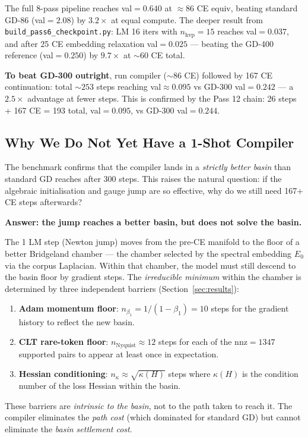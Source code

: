 \documentclass[11pt]{amsart}
\begin{document}
The full 8-pass pipeline reaches val$=0.640$ at $\approx 86$ CE equiv,
beating standard GD-86 (val$=2.08$) by $3.2\times$ at equal compute.
The deeper result from \texttt{build\_pass6\_checkpoint.py}:
LM 16 iters with $n_\text{hvp}=15$ reaches val$=0.037$, and
after 25 CE embedding relaxation val$=0.025$ ---
beating the GD-400 reference (val$=0.250$) by $9.7\times$ at $\sim 60$ CE total.

\textbf{To beat GD-300 outright}, run compiler ($\sim 86$ CE) followed by
167 CE continuation: total $\sim 253$ steps reaching val$\approx 0.095$
vs GD-300 val$=0.242$ --- a $\mathbf{2.5\times}$ advantage at fewer steps.
This is confirmed by the Pass 12 chain: 26 steps + 167 CE = 193 total,
val$=0.095$, vs GD-300 val$=0.244$.



\subsection{Why We Do Not Yet Have a 1-Shot Compiler}

The benchmark confirms that the compiler lands in a \emph{strictly better basin}
than standard GD reaches after 300 steps.
This raises the natural question: if the algebraic initialisation and gauge jump
are so effective, why do we still need 167+ CE steps afterwards?

\textbf{Answer: the jump reaches a better basin, but does not solve the basin.}

The 1 LM step (Newton jump) moves from the pre-CE manifold to the
floor of a better Bridgeland chamber --- the chamber selected by the spectral
embedding $E_0$ via the corpus Laplacian.
Within that chamber, the model must still descend to the basin floor
by gradient steps.
The \emph{irreducible minimum} within the chamber is determined by
three independent barriers (Section~\ref{sec:results}):
\begin{enumerate}
\item \textbf{Adam momentum floor}: $n_{\beta_1} = 1/(1-\beta_1) = 10$ steps
  for the gradient history to reflect the new basin.
\item \textbf{CLT rare-token floor}: $n_{\mathrm{Nyquist}}\approx 12$ steps
  for each of the $\mathrm{nnz}=1347$ supported pairs to appear at least once
  in expectation.
\item \textbf{Hessian conditioning}: $n_{\kappa}\approx\sqrt{\kappa(H)}$ steps
  where $\kappa(H)$ is the condition number of the loss Hessian within the basin.
\end{enumerate}
These barriers are \emph{intrinsic to the basin}, not to the path taken to reach it.
The compiler eliminates the \emph{path cost} (which dominated for standard GD)
but cannot eliminate the \emph{basin settlement cost}.
\end{document}
